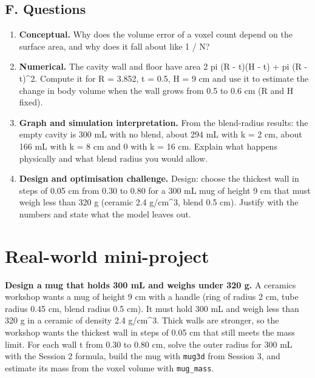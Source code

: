 \documentclass[11pt,a4paper]{article}
\begin{document}
\subsection*{F. Questions}
\begin{enumerate}[nosep]
\item \textbf{Conceptual.} Why does the volume error of a voxel count depend on the surface area, and why does it fall about like 1 / N?
\item \textbf{Numerical.} The cavity wall and floor have area 2 pi (R - t)(H - t) + pi (R - t)\textasciicircum{}2. Compute it for R = 3.852, t = 0.5, H = 9 cm and use it to estimate the change in body volume when the wall grows from 0.5 to 0.6 cm (R and H fixed).
\item \textbf{Graph and simulation interpretation.} From the blend-radius results: the empty cavity is 300 mL with no blend, about 294 mL with k = 2 cm, about 166 mL with k = 8 cm and 0 with k = 16 cm. Explain what happens physically and what blend radius you would allow.
\item \textbf{Design and optimisation challenge.} Design: choose the thickest wall in steps of 0.05 cm from 0.30 to 0.80 for a 300 mL mug of height 9 cm that must weigh less than 320 g (ceramic 2.4 g/cm\textasciicircum{}3, blend 0.5 cm). Justify with the numbers and state what the model leaves out.
\end{enumerate}

\section{Real-world mini-project}
\textbf{Design a mug that holds 300 mL and weighs under 320 g.} A ceramics workshop wants a mug of height 9 cm with a handle (ring of radius 2 cm, tube radius 0.45 cm, blend radius 0.5 cm). It must hold 300 mL and weigh less than 320 g in a ceramic of density 2.4 g/cm\textasciicircum{}3. Thick walls are stronger, so the workshop wants the thickest wall in steps of 0.05 cm that still meets the mass limit. For each wall t from 0.30 to 0.80 cm, solve the outer radius for 300 mL with the Session 2 formula, build the mug with \texttt{mug3d} from Session 3, and estimate its mass from the voxel volume with \texttt{mug\_mass}.
\end{document}
